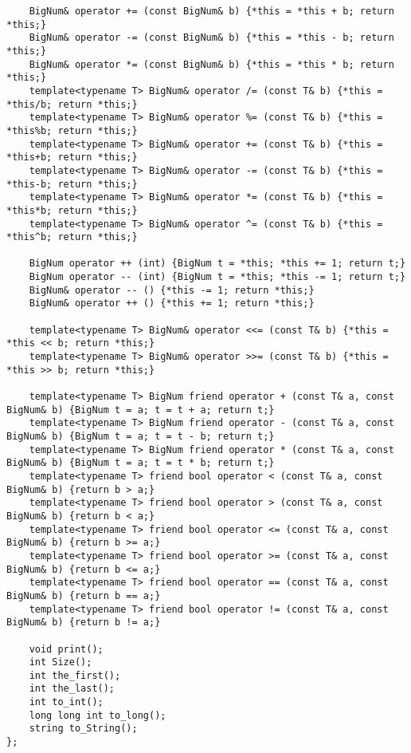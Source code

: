 \begin{lstlisting}
    BigNum& operator += (const BigNum& b) {*this = *this + b; return *this;}
    BigNum& operator -= (const BigNum& b) {*this = *this - b; return *this;}
    BigNum& operator *= (const BigNum& b) {*this = *this * b; return *this;}
    template<typename T> BigNum& operator /= (const T& b) {*this = *this/b; return *this;}
    template<typename T> BigNum& operator %= (const T& b) {*this = *this%b; return *this;}
    template<typename T> BigNum& operator += (const T& b) {*this = *this+b; return *this;}
    template<typename T> BigNum& operator -= (const T& b) {*this = *this-b; return *this;}
    template<typename T> BigNum& operator *= (const T& b) {*this = *this*b; return *this;}
    template<typename T> BigNum& operator ^= (const T& b) {*this = *this^b; return *this;}

    BigNum operator ++ (int) {BigNum t = *this; *this += 1; return t;}
    BigNum operator -- (int) {BigNum t = *this; *this -= 1; return t;}
    BigNum& operator -- () {*this -= 1; return *this;}
    BigNum& operator ++ () {*this += 1; return *this;}

    template<typename T> BigNum& operator <<= (const T& b) {*this = *this << b; return *this;}
    template<typename T> BigNum& operator >>= (const T& b) {*this = *this >> b; return *this;}

    template<typename T> BigNum friend operator + (const T& a, const BigNum& b) {BigNum t = a; t = t + a; return t;}
    template<typename T> BigNum friend operator - (const T& a, const BigNum& b) {BigNum t = a; t = t - b; return t;}
    template<typename T> BigNum friend operator * (const T& a, const BigNum& b) {BigNum t = a; t = t * b; return t;}
    template<typename T> friend bool operator < (const T& a, const BigNum& b) {return b > a;}
    template<typename T> friend bool operator > (const T& a, const BigNum& b) {return b < a;}
    template<typename T> friend bool operator <= (const T& a, const BigNum& b) {return b >= a;}
    template<typename T> friend bool operator >= (const T& a, const BigNum& b) {return b <= a;}
    template<typename T> friend bool operator == (const T& a, const BigNum& b) {return b == a;}
    template<typename T> friend bool operator != (const T& a, const BigNum& b) {return b != a;}

    void print();    
    int Size();        
    int the_first();  
    int the_last();      
    int to_int();   
    long long int to_long();
    string to_String();
};


\end{lstlisting}
